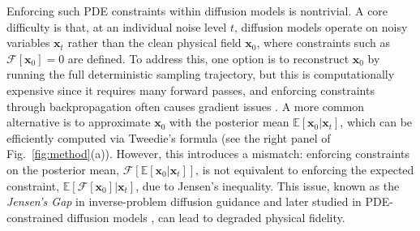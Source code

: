 \documentclass{article}
\theoremstyle{plain}
\theoremstyle{definition}
\theoremstyle{remark}
\def\vx{{\bm{x}}}
\begin{document}


Enforcing such PDE constraints within diffusion models is nontrivial. A core difficulty is that, at an individual noise level $t$, diffusion models operate on noisy variables $\vx_t$ rather than the clean physical field $\vx_0$, where constraints such as $\mathcal{F}[\vx_0] = 0$ are defined. To address this, one option is to reconstruct $\vx_0$ by running the full deterministic sampling trajectory, but this is computationally expensive since it requires many forward passes, and enforcing constraints through backpropagation often causes gradient issues \cite{bastek2025pdim}. A more common alternative is to approximate $\vx_0$ with the posterior mean $\mathbb{E}[\vx_0 | \vx_t]$, which can be efficiently computed via Tweedie’s formula \cite{bastek2025pdim, huang2024diffusionpde, cheng2025eci, jacobsen2024cocogen, ddrm, ddnm, diffpir, daps, LGD, DPG, scg} (see the right panel of Fig.~\ref{fig:method}(a)). However, this introduces a mismatch: enforcing constraints on the posterior mean, $\mathcal{F}[\mathbb{E}[\vx_0 | \vx_t]]$, is not equivalent to enforcing the expected constraint, $\mathbb{E}[\mathcal{F}[\vx_0] | \vx_t]$, due to Jensen's inequality. This issue, known as the \textit{Jensen's Gap} in inverse-problem diffusion guidance \cite{chung2022dps} and later studied in PDE-constrained diffusion models \cite{bastek2025pdim, huang2024diffusionpde}, can lead to degraded physical fidelity.
\end{document}
